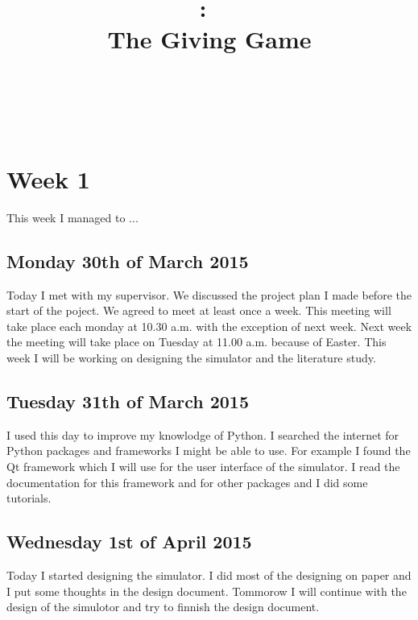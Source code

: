 \documentclass{article}
\title{
\vspace{2in}
\textmd{\textbf{\hmwkClass:\ \hmwkTitle}}\\
\textmd{The Giving Game}\\
\normalsize\vspace{0.1in}\small{\hmwkDueDate}\\
\vspace{0.1in}\large{\textit{\hmwkClassInstructor\ \hmwkClassTime}}
\vspace{3in}
}
\author{\textbf{\hmwkAuthorName}}
\date{} %
\begin{document}
\maketitle



\newpage
\tableofcontents
\newpage



\section{Week 1}
This week I managed to ...

\subsection{Monday 30th of March 2015}
Today I met with my supervisor. We discussed the project plan I made before the start of the poject. We agreed to meet at least once a week. This meeting will take place each monday at 10.30 a.m. with the exception of next week. Next week the meeting will take place on Tuesday at 11.00 a.m. because of Easter. This week I will be working on designing the simulator and the literature study.

\subsection{Tuesday 31th of March 2015}
I used this day to improve my knowlodge of Python. I searched the internet for Python packages and frameworks I might be able to use. For example I found the Qt framework which I will use for the user interface of the simulator. I read the documentation for this framework and for other packages and I did some tutorials.

\subsection{Wednesday 1st of April 2015}
Today I started designing the simulator. I did most of the designing on paper and I put some thoughts in the design document. Tommorow I will continue with the design of the simulotor and try to finnish the design document.
\end{document}
